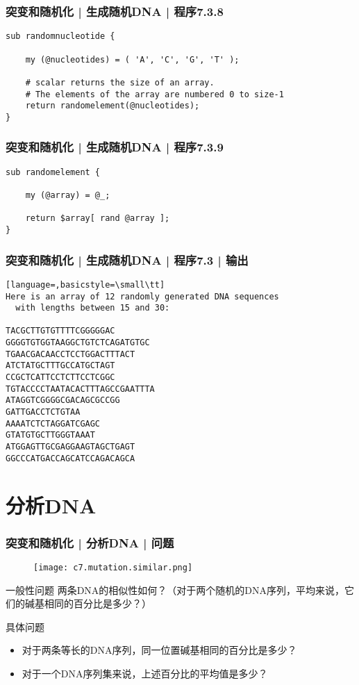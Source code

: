 \begin{frame}[fragile]
  \frametitle{突变和随机化 | 生成随机DNA | 程序7.3.8}
\begin{lstlisting}[firstnumber=140]
sub randomnucleotide {

    my (@nucleotides) = ( 'A', 'C', 'G', 'T' );

    # scalar returns the size of an array.
    # The elements of the array are numbered 0 to size-1
    return randomelement(@nucleotides);
}
\end{lstlisting}
\end{frame}


\begin{frame}[fragile]
  \frametitle{突变和随机化 | 生成随机DNA | 程序7.3.9}
\begin{lstlisting}[firstnumber=156]
sub randomelement {

    my (@array) = @_;

    return $array[ rand @array ];
}
\end{lstlisting}
\end{frame}


\begin{frame}[fragile]
  \frametitle{突变和随机化 | 生成随机DNA | 程序7.3 | 输出}
\begin{lstlisting}[language=,basicstyle=\small\tt]
Here is an array of 12 randomly generated DNA sequences
  with lengths between 15 and 30:

TACGCTTGTGTTTTCGGGGGAC
GGGGTGTGGTAAGGCTGTCTCAGATGTGC
TGAACGACAACCTCCTGGACTTTACT
ATCTATGCTTTGCCATGCTAGT
CCGCTCATTCCTCTTCCTCGGC
TGTACCCCTAATACACTTTAGCCGAATTTA
ATAGGTCGGGGCGACAGCGCCGG
GATTGACCTCTGTAA
AAAATCTCTAGGATCGAGC
GTATGTGCTTGGGTAAAT
ATGGAGTTGCGAGGAAGTAGCTGAGT
GGCCCATGACCAGCATCCAGACAGCA
\end{lstlisting}
\end{frame}

\section{分析DNA}
\begin{frame}
  \frametitle{突变和随机化 | 分析DNA | 问题}
  \begin{figure}
    \centering
    \texttt{[image: c7.mutation.similar.png]}
  \end{figure}
  \begin{block}{一般性问题}
    两条DNA的相似性如何？（对于两个随机的DNA序列，平均来说，它们的碱基相同的百分比是多少？）
  \end{block}
  \pause
  \begin{block}{具体问题}
    \begin{itemize}
      \item 对于两条等长的DNA序列，同一位置碱基相同的百分比是多少？
      \item 对于一个DNA序列集来说，上述百分比的平均值是多少？
    \end{itemize}
  \end{block}
\end{frame}

